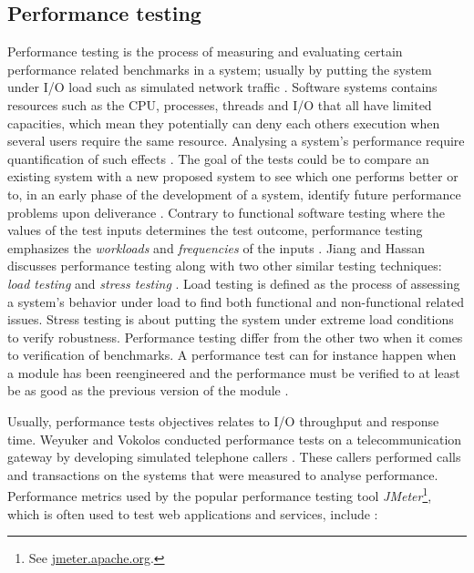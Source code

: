 
\subsection{Performance testing}

Performance testing is the process of measuring and evaluating certain
performance related benchmarks in a system; usually by putting the system under
I/O load such as simulated network traffic \cite{jiang2015survey}. Software
systems contains resources such as the CPU, processes, threads and I/O that all
have limited capacities, which mean they potentially can deny each others
execution when several users require the same resource. Analysing a system's
performance require quantification of such effects \cite{woodside2007future}.
The goal of the tests could be to compare an existing system with a new
proposed system to see which one performs better \cite{avritzer1996deriving} or
to, in an early phase of the development of a system, identify future
performance problems upon deliverance \cite{weyuker2000experience}. Contrary to
functional software testing where the values of the test inputs determines the
test outcome, performance testing emphasizes the \textit{workloads} and
\textit{frequencies} of the inputs \cite{weyuker2000experience}. Jiang and
Hassan discusses performance testing along with two other similar testing
techniques: \textit{load testing} and \textit{stress testing}
\cite{jiang2015survey}. Load testing is defined as the process of assessing a
system's behavior under load to find both functional and non-functional related
issues. Stress testing is about putting the system under extreme load
conditions to verify robustness.  Performance testing differ from the other two
when it comes to verification of benchmarks. A performance test can for
instance happen when a module has been reengineered and the performance must be
verified to at least be as good as the previous version of the module
\cite{jiang2015survey}.

Usually, performance tests objectives relates to I/O throughput and response
time. Weyuker and Vokolos conducted performance tests on a telecommunication
gateway by developing simulated telephone callers \cite{weyuker2000experience}.
These callers performed calls and transactions on the systems that were
measured to analyse performance. Performance metrics used by the popular
performance testing tool \textit{JMeter}\footnote{See
\url{jmeter.apache.org}.}, which is often used to test web applications and
services, include \cite{mendelawy2016kpis}:

